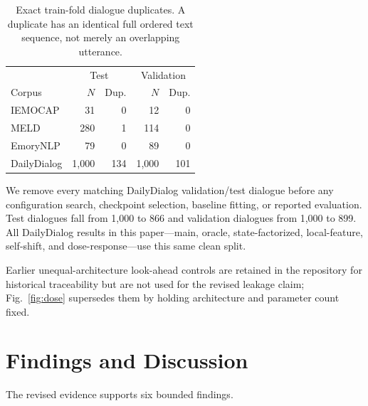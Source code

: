 \documentclass{ieeeaccess}
\begin{document}
\begin{table}[t]
\centering
\footnotesize
\caption{Exact train-fold dialogue duplicates. A duplicate has an identical full ordered text
sequence, not merely an overlapping utterance.}
\label{tab:duplicates}
\begin{tabular}{lrrrr}
\toprule
& \multicolumn{2}{c}{Test} & \multicolumn{2}{c}{Validation} \\
Corpus & $N$ & Dup. & $N$ & Dup. \\
\midrule
IEMOCAP     & 31    & 0   & 12    & 0 \\
MELD        & 280   & 1   & 114   & 0 \\
EmoryNLP    & 79    & 0   & 89    & 0 \\
DailyDialog & 1{,}000 & 134 & 1{,}000 & 101 \\
\bottomrule
\end{tabular}
\end{table}

We remove every matching DailyDialog validation/test dialogue before any configuration search,
checkpoint selection, baseline fitting, or reported evaluation. Test dialogues fall from 1,000 to
866 and validation dialogues from 1,000 to 899. All DailyDialog results in this paper---main,
oracle, state-factorized, local-feature, self-shift, and dose-response---use this same clean split.

Earlier unequal-architecture look-ahead controls are retained in the repository for historical
traceability but are not used for the revised leakage claim; Fig.~\ref{fig:dose} supersedes them by
holding architecture and parameter count fixed.

\vspace{-2mm}\section{Findings and Discussion}

The revised evidence supports six bounded findings.
\end{document}
